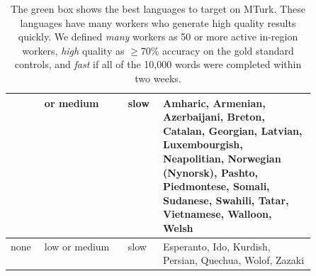 \documentclass[11pt]{article}
\begin{document}
\begin{table}
\begin{tabular}{|p{.1\linewidth}|p{.1\linewidth}|p{.1\linewidth}|p{0.5\linewidth}|}
&or medium&slow&\cellcolor[rgb]{0.8, 0.5, 0.5}Amharic,  Armenian, Azerbaijani, Breton, Catalan, Georgian, Latvian, Luxembourgish, Neapolitian, Norwegian (Nynorsk), Pashto, Piedmontese, Somali, Sudanese, Swahili, Tatar, Vietnamese, Walloon, Welsh \\\hline
none&low or medium&slow&\cellcolor[rgb]{0.8, 0.5, 0.5}  Esperanto, Ido, Kurdish, Persian, Quechua, Wolof, Zazaki\\\hline
\end{tabular}
\normalsize
\caption{The green box shows the best languages to target on MTurk. These languages have many workers who generate high quality results quickly. We defined {\it many} workers as 50 or more active in-region workers, {\it high} quality as $\geq$70\% accuracy on the gold standard controls, and {\it fast} if all of the 10,000 words were completed within two weeks.}
\label{recommendations}
\end{table}
\end{document}
